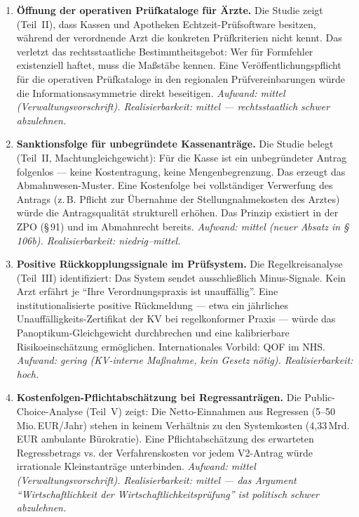 \documentclass{umbruch-position}
\begin{document}
\begin{enumerate}

  \item \textbf{Öffnung der operativen Prüfkataloge für Ärzte.}
  Die Studie zeigt (Teil~II), dass Kassen und Apotheken Echtzeit-Prüfsoftware besitzen, während der verordnende Arzt die konkreten Prüfkriterien nicht kennt. Das verletzt das rechtsstaatliche Bestimmtheitsgebot: Wer für Formfehler existenziell haftet, muss die Maßstäbe kennen. Eine Veröffentlichungspflicht für die operativen Prüfkataloge in den regionalen Prüfvereinbarungen würde die Informationsasymmetrie direkt beseitigen.
  \textit{Aufwand: mittel (Verwaltungsvorschrift). Realisierbarkeit: mittel --- rechtsstaatlich schwer abzulehnen.}

  \item \textbf{Sanktionsfolge für unbegründete Kassenanträge.}
  Die Studie belegt (Teil~II, Machtungleichgewicht): Für die Kasse ist ein unbegründeter Antrag folgenlos --- keine Kostentragung, keine Mengenbegrenzung. Das erzeugt das Abmahnwesen-Muster. Eine Kostenfolge bei vollständiger Verwerfung des Antrags (z.\,B. Pflicht zur Übernahme der Stellungnahmekosten des Arztes) würde die Antragsqualität strukturell erhöhen. Das Prinzip existiert in der ZPO (\S\,91) und im Abmahnrecht bereits.
  \textit{Aufwand: mittel (neuer Absatz in \S\,106b). Realisierbarkeit: niedrig--mittel.}

  \item \textbf{Positive Rückkopplungssignale im Prüfsystem.}
  Die Regelkreisanalyse (Teil~III) identifiziert: Das System sendet ausschließlich Minus-Signale. Kein Arzt erfährt je ``Ihre Verordnungspraxis ist unauffällig''. Eine institutionalisierte positive Rückmeldung --- etwa ein jährliches Unauffälligkeits-Zertifikat der KV bei regelkonformer Praxis --- würde das Panoptikum-Gleichgewicht durchbrechen und eine kalibrierbare Risiko\-ein\-schätzung ermöglichen. Internationales Vorbild: QOF im NHS.
  \textit{Aufwand: gering (KV-interne Maßnahme, kein Gesetz nötig). Realisierbarkeit: hoch.}

  \item \textbf{Kostenfolgen-Pflichtabschätzung bei Regressanträgen.}
  Die Public-Choice-Analyse (Teil~V) zeigt: Die Netto-Einnahmen aus Regressen (5--50\,Mio.\,EUR/Jahr) stehen in keinem Verhältnis zu den Systemkosten (4,33\,Mrd.\,EUR ambulante Bürokratie). Eine Pflichtabschätzung des erwarteten Regressbetrags vs. der Verfahrenskosten vor jedem V2-Antrag würde irrationale Kleinstanträge unterbinden.
  \textit{Aufwand: mittel (Verwaltungsvorschrift). Realisierbarkeit: mittel --- das Argument ``Wirtschaftlichkeit der Wirtschaftlichkeitsprüfung'' ist politisch schwer abzulehnen.}


\end{enumerate}
\end{document}
